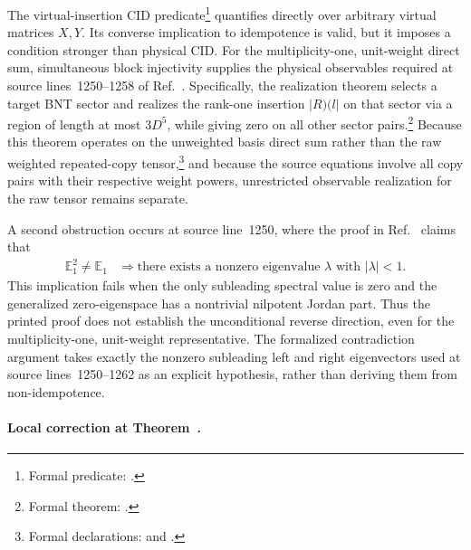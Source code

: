 \documentclass{article}
\begin{document}
The virtual-insertion CID predicate\footnote{Formal predicate:
.} quantifies directly over arbitrary virtual
matrices $X,Y$. Its converse implication to idempotence is valid, but it
imposes a condition stronger than physical CID. For the multiplicity-one,
unit-weight direct sum, simultaneous block injectivity supplies the physical
observables required at source lines~1250--1258 of
Ref.~\cite{Cirac2016MPDO_arXiv}. Specifically, the realization theorem selects
a target BNT sector and realizes the rank-one insertion $|R)(l|$ on that sector
via a region of length at most $3D^5$, while giving zero on all other sector
pairs.\footnote{Formal theorem:
.}
Because this theorem operates on the unweighted basis direct sum rather than
the raw weighted repeated-copy tensor,\footnote{Formal declarations:
 and
.} and because the
source equations involve all copy pairs with their respective weight powers,
unrestricted observable realization for the raw tensor remains separate.

A second obstruction occurs at source line~1250, where the proof in
Ref.~\cite{Cirac2016MPDO_arXiv} claims that
\begin{align}
    \mathbb E_1^2\ne\mathbb E_1
        &\Longrightarrow
        \text{there exists a nonzero eigenvalue $\lambda$ with
        $|\lambda|<1$.}
    \label{eq:cpsv16_pure_zcl_local_orthogonality_scope_false_spectral_inference}
\end{align}
This implication fails when the only subleading spectral value is zero and the
generalized zero-eigenspace has a nontrivial nilpotent Jordan part. Thus the
printed proof does not establish the unconditional reverse direction, even for
the multiplicity-one, unit-weight representative. The formalized contradiction
argument takes exactly the nonzero subleading left and right eigenvectors used
at source lines~1250--1262 as an explicit hypothesis, rather than deriving them
from non-idempotence.

\paragraph{Local correction at Theorem~.}
\end{document}
